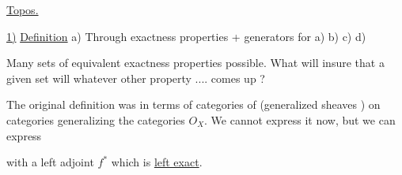 \uline{Topos.}

\uline{1)} \uline{Definition} a) Through exactness properties + generators
for   a) b) c) d)

 Many sets of equivalent exactness properties possible.
What will insure that a given set will 
whatever other property .... comes up ?

The original definition was  in terms of
categories of (generalized sheaves ) on categories generalizing  the categories  $O_X$. We cannot
express it now, but we can express


with a left adjoint $f^*$ which is \uline{left exact}.
